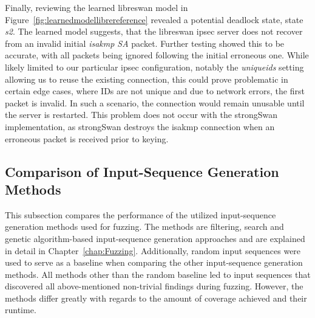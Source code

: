 Finally, reviewing the learned libreswan model in Figure~\ref{fig:learnedmodellibrereference} revealed a potential deadlock state, state \emph{s2}. The learned model suggests, that the libreswan \ac{ipsec} server does not recover from an invalid initial \emph{\ac{isakmp} SA} packet. Further testing showed this to be accurate, with all packets being ignored following the initial erroneous one. While likely limited to our particular \ac{ipsec} configuration, notably the \emph{uniqueids} setting allowing us to reuse the existing connection, this could prove problematic in certain edge cases, where IDs are not unique and due to network errors, the first packet is invalid. In such a scenario, the connection would remain unusable until the server is restarted. This problem does not occur with the strongSwan implementation, as strongSwan destroys the \ac{isakmp} connection when an erroneous packet is received prior to keying.


\subsection{Comparison of Input-Sequence Generation Methods} \label{subsec:mutation_vs_filtering}
This subsection compares the performance of the utilized input-sequence generation methods used for fuzzing. The methods are filtering, search and genetic algorithm-based input-sequence generation approaches and are explained in detail in Chapter~\ref{chap:Fuzzing}. Additionally, random input sequences were used to serve as a baseline when comparing the other input-sequence generation methods. All methods other than the random baseline led to input sequences that discovered all above-mentioned non-trivial findings during fuzzing. However, the methods differ greatly with regards to the amount of coverage achieved and their runtime.

